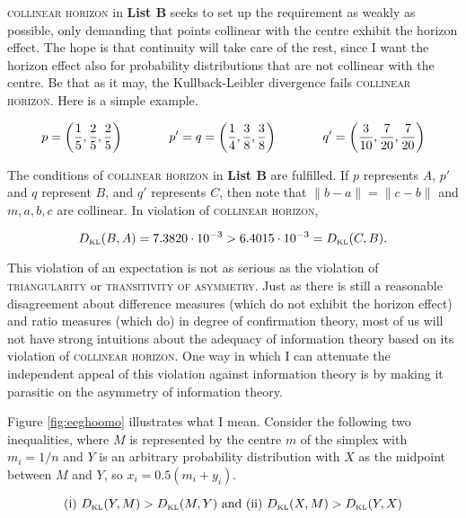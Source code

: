 \documentclass[11pt]{article}
\begin{document}
\textsc{collinear horizon} in \textbf{List B} seeks to set up the requirement
as weakly as possible, only demanding that points collinear with the
centre exhibit the horizon effect. The hope is that continuity will
take care of the rest, since I want the horizon effect also for
probability distributions that are not collinear with the centre. Be
that as it may, the Kullback-Leibler divergence fails
\textsc{collinear horizon}. Here is a simple example.

\begin{equation}
  \label{eq:ubiesohx}
    p=\left(\frac{1}{5},\frac{2}{5},\frac{2}{5}\right) \hspace{.5in}
    p'=q=\left(\frac{1}{4},\frac{3}{8},\frac{3}{8}\right)  \hspace{.5in}
    q'=\left(\frac{3}{10},\frac{7}{20},\frac{7}{20}\right)
\end{equation}

The conditions of \textsc{collinear horizon} in \textbf{List B} are
fulfilled. If $p$ represents $A$, $p'$ and $q$ represent $B$, and $q'$
represents $C$, then note that $\|b-a\|=\|c-b\|$ and $m,a,b,c$ are
collinear. In violation of \textsc{collinear horizon},

\begin{equation}
  \label{eq:eiloothu}
  D_{\mbox{\tiny KL}}(B,A)=7.3820\cdot{}10^{-3}>6.4015\cdot{}10^{-3}=D_{\mbox{\tiny KL}}(C,B).
\end{equation}

This violation of an expectation is not as serious as the violation of
\textsc{triangularity} or \textsc{transitivity of asymmetry}. Just as
there is still a reasonable disagreement about difference measures
(which do not exhibit the horizon effect) and ratio measures (which
do) in degree of confirmation theory, most of us will not have strong
intuitions about the adequacy of information theory based on its
violation of \textsc{collinear horizon}. One way in which I can
attenuate the independent appeal of this violation against information
theory is by making it parasitic on the asymmetry of information
theory.

Figure \ref{fig:eeghoomo} illustrates what I mean. Consider the
following two inequalities, where $M$ is represented by the centre
$m$ of the simplex with $m_{i}=1/n$ and $Y$ is an arbitrary
probability distribution with $X$ as the midpoint between $M$ and $Y$,
so $x_{i}=0.5(m_{i}+y_{i})$.

\begin{equation}
  \label{eq:dailoosu}
  \mbox{(i) }D_{\mbox{\tiny KL}}(Y,M)>D_{\mbox{\tiny KL}}(M,Y)\mbox{ and (ii) }D_{\mbox{\tiny KL}}(X,M)>D_{\mbox{\tiny KL}}(Y,X)
\end{equation}
\end{document}
